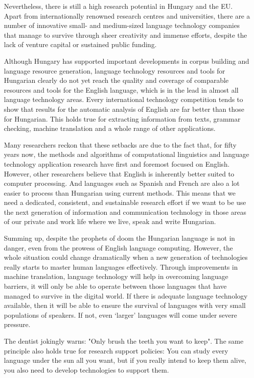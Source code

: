 \begin{multicols}{2}
  Nevertheless, there is still a high research potential in Hungary and the EU. Apart from internationally renowned research centres and universities, there are a number of innovative small- and medium-sized language technology companies that manage to survive through sheer creativity and immense efforts, despite the lack of venture capital or sustained public funding.

  Although Hungary has supported important developments in corpus building and language resource generation, language technology resources and tools for Hungarian clearly do not yet reach the quality and coverage of comparable resources and tools for the English language, which is in the lead in almost all language technology areas. Every international technology competition tends to show that results for the automatic analysis of English are far better than those for Hungarian. This holds true for extracting information from texts, grammar checking, machine translation and a whole range of other applications.

  Many researchers reckon that these setbacks are due to the fact that, for fifty years now, the methods and algorithms of computational linguistics and language technology application research have first and foremost focused on English. However, other researchers believe that English is inherently better suited to computer processing. And languages such as Spanish and French are also a lot easier to process than Hungarian using current methods. This means that we need a dedicated, consistent, and sustainable research effort if we want to be use the next generation of information and communication technology in those areas of our private and work life where we live, speak and write Hungarian.

  Summing up, despite the prophets of doom the Hungarian language is not in danger, even from the prowess of English language computing. However, the whole situation could change dramatically when a new generation of technologies really starts to master human languages effectively. Through improvements in machine translation, language technology will help in overcoming language barriers, it will only be able to operate between those languages that have managed to survive in the digital world. If there is adequate language technology available, then it will be able to ensure the survival of languages with very small populations of speakers. If not, even ‘larger’ languages will come under severe pressure.

  The dentist jokingly warns: "Only brush the teeth you want to keep".  The same principle also holds true for research support policies: You can study every language under the sun all you want, but if you really 
intend to keep them alive, you also need to develop technologies to support them.
  
  \end{multicols}

